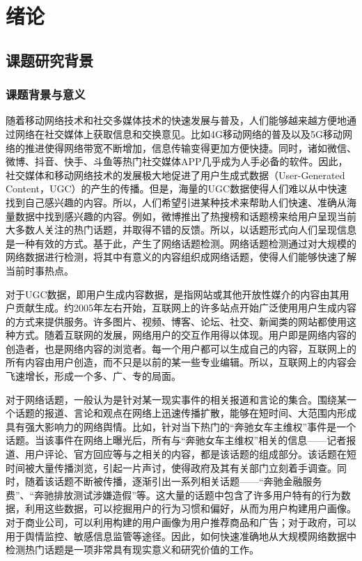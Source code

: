 \chapter{绪论}\label{chap:introduction}

\section{课题研究背景}

\subsection{课题背景与意义}

随着移动网络技术和社交多媒体技术的快速发展与普及，人们能够越来越方便地通过网络在社交媒体上获取信息和交换意见。比如4G移动网络的普及以及5G移动网络的推进使得网络带宽不断增加，信息传输变得更加方便快捷。同时，诸如微信、微博、抖音、快手、斗鱼等热门社交媒体APP几乎成为人手必备的软件。因此，社交媒体和移动网络技术的发展极大地促进了用户生成式数据（User-Generated Content，UGC）的产生的传播\citep{pang-2013-unsupervised}。但是，海量的UGC数据使得人们难以从中快速找到自己感兴趣的内容。所以，人们希望引进某种技术来帮助人们快速、准确从海量数据中找到感兴趣的内容。例如，微博推出了热搜榜和话题榜来给用户呈现当前大多数人关注的热门话题，并取得不错的反馈。所以，以话题形式向人们呈现信息是一种有效的方式。基于此，产生了网络话题检测。网络话题检测通过对大规模的网络数据进行检测，将其中有意义的内容组织成网络话题，使得人们能够快速了解当前时事热点。

对于UGC数据，即用户生成内容数据，是指网站或其他开放性媒介的内容由其用户贡献生成。约2005年左右开始，互联网上的许多站点开始广泛使用用户生成内容的方式来提供服务。许多图片、视频、博客、论坛、社交、新闻类的网站都使用这种方式。随着互联网的发展，网络用户的交互作用得以体现。用户即是网络内容的创造者，也是网络内容的浏览者。每一个用户都可以生成自己的内容，互联网上的所有内容由用户创造，而不只是以前的某一些专业编辑。所以，互联网上的内容会飞速增长，形成一个多、广、专的局面。

对于网络话题，一般认为是针对某一现实事件的相关报道和言论的集合。围绕某一个话题的报道、言论和观点在网络上迅速传播扩散，能够在短时间、大范围内形成具有强大影响力的网络舆情。比如，针对当下热门的“奔驰女车主维权”事件是一个话题。当该事件在网络上曝光后，所有与“奔驰女车主维权”相关的信息——记者报道、用户评论、官方回应等与之相关的内容，都是该话题的组成部分。该话题在短时间被大量传播浏览，引起一片声讨，使得政府及其有关部门立刻着手调查。同时，随着该话题不断被传播，逐渐引出一系列相关话题——“奔驰金融服务费”、“奔驰排放测试涉嫌造假”等。这大量的话题中包含了许多用户特有的行为数据，利用这些数据，可以挖掘用户的行为习惯和偏好，从而为用户构建用户画像。对于商业公司，可以利用构建的用户画像为用户推荐商品和广告；对于政府，可以用于舆情监控、敏感信息监管等途径。因此，如何快速准确地从大规模网络数据中检测热门话题是一项非常具有现实意义和研究价值的工作。


